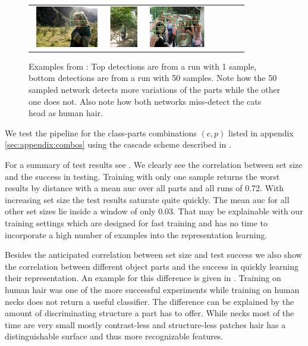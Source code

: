 \begin{figure}[htb]
\begin{tabular}{ccccccc}
      \includegraphics[height=1.8cm]{figures/hm_examples/50s_bbox_2009_005222} &
      \includegraphics[height=1.8cm]{figures/hm_examples/50s_bbox_2009_002715} &
      \includegraphics[height=1.8cm]{figures/hm_examples/50s_bbox_2010_005967}

    \end{tabular}
	\caption{Examples from : Top detections are from a run with 1 sample, bottom detections are from a run with 50 samples. Note how the 50 sampled network detects more variations of the parts while the other one does not. Also note how both networks miss-detect the cats head as human hair.}
  \label{fig:hm_examples}
\end{figure}
We test the pipeline for the class-parts combinations $(c,p)$ listed in appendix \ref{sec:appendix:combos} using the cascade scheme described  in .

For a summary of test results see . We clearly see the correlation between set size and the success in testing. Training with only one sample returns the worst results by distance with a mean \gls{auc} over all parts and all runs of 0.72. With increasing set size the test results saturate quite quickly. The mean \gls{auc} for all other set sizes lie inside a window of only 0.03. That may be explainable with our training settings which are designed for fast training and has no time to incorporate a high number of examples into the representation learning.

Besides the anticipated correlation between set size and test success we also show the correlation between different object parts and the success in quickly learning their representation. An example for this difference is given in . Training on human hair was one of the more successful experiments while training on human necks does not return a useful classifier. The difference can be explained by the amount of discriminating structure a part has to offer. While necks most of the time are very small mostly contrast-less and structure-less patches hair has a distinguishable surface and thus more recognizable features.

